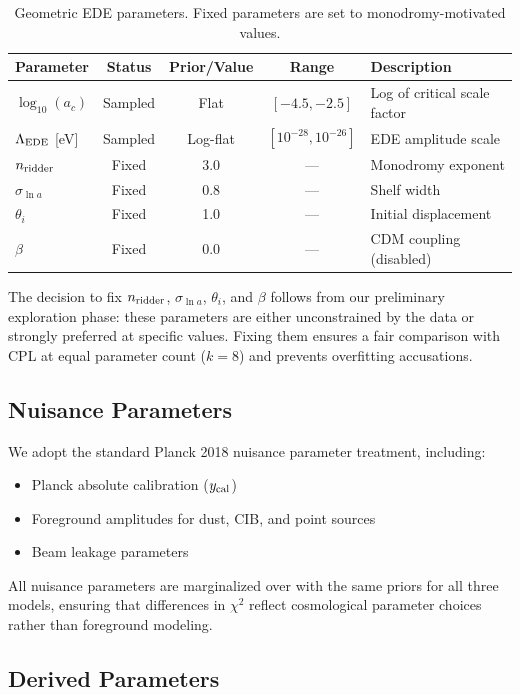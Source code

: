 \documentclass[a4paper,11pt]{article}
\begin{document}
\begin{table}[h]
\centering
\caption{Geometric EDE parameters. Fixed parameters are set to monodromy-motivated values.}
\label{tab:ede_priors}
\begin{tabular}{lcccl}
\toprule
Parameter & Status & Prior/Value & Range & Description \\
\midrule
$\log_{10}(a_c)$ & Sampled & Flat & $[-4.5, -2.5]$ & Log of critical scale factor \\
$\Lambda_{\rm EDE}$ [eV] & Sampled & Log-flat & $[10^{-28}, 10^{-26}]$ & EDE amplitude scale \\
\midrule
$n_{\rm ridder}$ & Fixed & 3.0 & --- & Monodromy exponent \\
$\sigma_{\ln a}$ & Fixed & 0.8 & --- & Shelf width \\
$\theta_i$ & Fixed & 1.0 & --- & Initial displacement \\
$\beta$ & Fixed & 0.0 & --- & CDM coupling (disabled) \\
\bottomrule
\end{tabular}
\end{table}

The decision to fix $n_{\rm ridder}$, $\sigma_{\ln a}$, $\theta_i$, and $\beta$ follows from our preliminary exploration phase: these parameters are either unconstrained by the data or strongly preferred at specific values. Fixing them ensures a fair comparison with CPL at equal parameter count ($k=8$) and prevents overfitting accusations.

\subsection{Nuisance Parameters}

We adopt the standard Planck 2018 nuisance parameter treatment, including:
\begin{itemize}
    \item Planck absolute calibration ($y_{\rm cal}$)
    \item Foreground amplitudes for dust, CIB, and point sources
    \item Beam leakage parameters
\end{itemize}

All nuisance parameters are marginalized over with the same priors for all three models, ensuring that differences in $\chi^2$ reflect cosmological parameter choices rather than foreground modeling.

\subsection{Derived Parameters}
\end{document}
